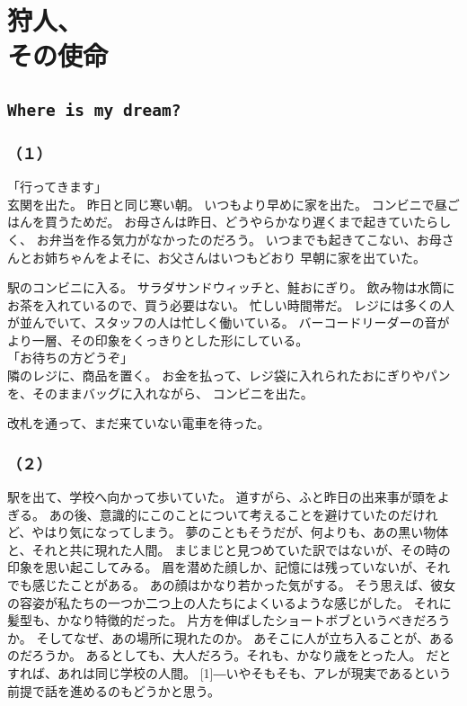 \documentclass[../IHMain]{subfiles}
\begin{document}
    
\chapter{狩人、\\その使命}
\section{\tt Where is my dream?}
\subsection*{（１）}
「行ってきます」\\
玄関を出た。
昨日と同じ寒い朝。
いつもより早めに家を出た。
コンビニで昼ごはんを買うためだ。
お母さんは昨日、どうやらかなり遅くまで起きていたらしく、
お弁当を作る気力がなかったのだろう。
いつまでも起きてこない、お母さんとお姉ちゃんをよそに、お父さんはいつもどおり
早朝に家を出ていた。

駅のコンビニに入る。
サラダサンドウィッチと、鮭おにぎり。
飲み物は水筒にお茶を入れているので、買う必要はない。
忙しい時間帯だ。
レジには多くの人が並んでいて、スタッフの人は忙しく働いている。
バーコードリーダーの音がより一層、その印象をくっきりとした形にしている。\\
「お待ちの方どうぞ」\\
隣のレジに、商品を置く。
お金を払って、レジ袋に入れられたおにぎりやパンを、そのままバッグに入れながら、
コンビニを出た。

改札を通って、まだ来ていない電車を待った。

\subsection*{（２）}
駅を出て、学校へ向かって歩いていた。
道すがら、ふと昨日の出来事が頭をよぎる。
あの後、意識的にこのことについて考えることを避けていたのだけれど、やはり気になってしまう。
夢のこともそうだが、何よりも、あの黒い物体と、それと共に現れた人間。
まじまじと見つめていた訳ではないが、その時の印象を思い起こしてみる。
眉を潜めた顔しか、記憶には残っていないが、それでも感じたことがある。
あの顔はかなり若かった気がする。
そう思えば、彼女の容姿が私たちの一つか二つ上の人たちによくいるような感じがした。
それに髪型も、かなり特徴的だった。
片方を伸ばしたショートボブというべきだろうか。
そしてなぜ、あの場所に現れたのか。
あそこに人が立ち入ることが、あるのだろうか。
あるとしても、大人だろう。それも、かなり歳をとった人。
だとすれば、あれは同じ学校の人間。
\scalebox{3}[1]{―}いやそもそも、アレが現実であるという前提で話を進めるのもどうかと思う。
\end{document}
